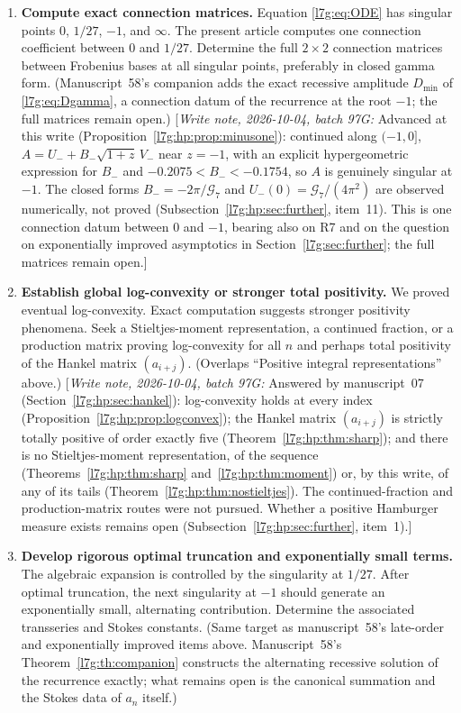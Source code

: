 \documentclass[11pt,letterpaper]{article}
\theoremstyle{remark}\newtheorem{remark}[theorem]{Remark}
\newcommand{\G}{\mathcal G_7}\newcommand{\Ast}{A_\star}
\newcommand{\hpnote}[1]{\textup{[}\emph{Write note, 2026-10-04, batch 97G:} #1\textup{]}}
\newcounter{l7gtrsavedeq}
\begin{document}
\begin{enumerate}[leftmargin=2em,label=\textbf{R\arabic*.}]
\item \textbf{Compute exact connection matrices.}
Equation \eqref{l7g:eq:ODE} has singular points $0$, $1/27$, $-1$, and
$\infty$. The present article computes one connection coefficient
between $0$ and $1/27$. Determine the full $2\times2$ connection
matrices between Frobenius bases at all singular points, preferably in
closed gamma form.
(Manuscript~58's companion adds the exact recessive amplitude
$D_{\min}$ of \eqref{l7g:eq:Dgamma}, a connection datum of the recurrence
at the root $-1$; the full matrices remain open.)
\hpnote{Advanced at this write (Proposition~\ref{l7g:hp:prop:minusone}):
continued along $(-1,0]$, $A=U_-+B_-\sqrt{1+z}\,V_-$ near $z=-1$, with an
explicit hypergeometric expression for $B_-$ and $-0.2075<B_-<-0.1754$, so
$A$ is genuinely singular at $-1$. The closed forms $B_-=-2\pi/\G$ and
$U_-(0)=\G/(4\pi^2)$ are observed numerically, not proved
(Subsection~\ref{l7g:hp:sec:further}, item~11). This is one connection
datum between $0$ and $-1$, bearing also on R7 and on the question on
exponentially improved asymptotics in Section~\ref{l7g:sec:further}; the
full matrices remain open.}

\item \textbf{Establish global log-convexity or stronger total positivity.}
We proved eventual log-convexity. Exact computation suggests stronger
positivity phenomena. Seek a Stieltjes-moment representation, a
continued fraction, or a production matrix proving log-convexity for all
$n$ and perhaps total positivity of the Hankel matrix $(a_{i+j})$.
(Overlaps ``Positive integral representations'' above.)
\hpnote{Answered by manuscript~07 (Section~\ref{l7g:hp:sec:hankel}):
log-convexity holds at every index (Proposition~\ref{l7g:hp:prop:logconvex});
the Hankel matrix $(a_{i+j})$ is strictly totally positive of order exactly
five (Theorem~\ref{l7g:hp:thm:sharp}); and there is no Stieltjes-moment
representation, of the sequence (Theorems~\ref{l7g:hp:thm:sharp}
and~\ref{l7g:hp:thm:moment}) or, by this write, of any of its tails
(Theorem~\ref{l7g:hp:thm:nostieltjes}). The continued-fraction and
production-matrix routes were not pursued. Whether a positive Hamburger
measure exists remains open (Subsection~\ref{l7g:hp:sec:further}, item~1).}

\item \textbf{Develop rigorous optimal truncation and exponentially small
terms.}
The algebraic expansion is controlled by the singularity at $1/27$.
After optimal truncation, the next singularity at $-1$ should generate an
exponentially small, alternating contribution. Determine the associated
transseries and Stokes constants.
(Same target as manuscript~58's late-order and exponentially improved
items above. Manuscript~58's Theorem~\ref{l7g:th:companion} constructs the
alternating recessive solution of the recurrence exactly; what remains
open is the canonical summation and the Stokes data of $a_n$ itself.)


\end{enumerate}
\end{document}
